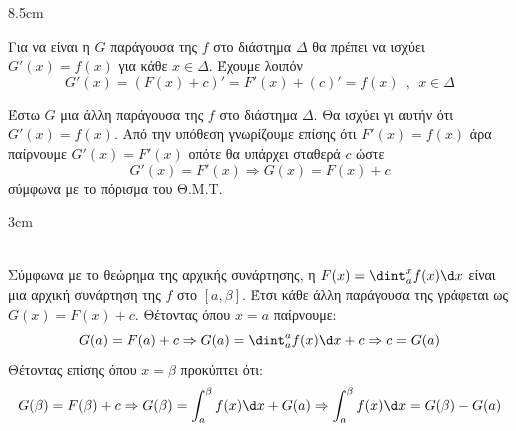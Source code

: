 \begin{Thewrhmabox}{8.5cm}
\label{thewrhma:arxikh_synarthsh}
\end{Thewrhmabox}
\textbf{}
\begin{alist}
\item Για να είναι η $ G $ παράγουσα της $ f $ στο διάστημα $ \varDelta $ θα πρέπει να ισχύει $ G'(x)=f(x) $ για κάθε $ x\in\varDelta $. Έχουμε λοιπόν
\[ G'(x)=(F(x)+c)'=F'(x)+(c)'=f(x)\ \ ,\ \ x\in\varDelta \]
\item Έστω $ G $ μια άλλη παράγουσα της $ f $ στο διάστημα $ \varDelta $. Θα ισχύει γι αυτήν ότι $ G'(x)=f(x) $. Από την υπόθεση γνωρίζουμε επίσης ότι $ F'(x)=f(x) $ άρα παίρνουμε $ G'(x)=F'(x) $ οπότε θα υπάρχει σταθερά $ c $ ώστε
\[ G'(x)=F'(x)\Rightarrow G(x)=F(x)+c \]
σύμφωνα με το πόρισμα του Θ.Μ.Τ.
\end{alist}
\begin{Thewrhmabox}{3cm}
\label{thewrhma:themelivdes_oloklhrwtikou}
\end{Thewrhmabox}
\textbf{}\\
Σύμφωνα με το θεώρημα της αρχικής συνάρτησης, η $ F(x)=\dint_{a}^{x}{f(x)\d x} $ είναι μια αρχική συνάρτηση της $ f $  στο $ [a,\beta] $. Έτσι κάθε άλλη παράγουσα της γράφεται ως $ G(x)=F(x)+c $. Θέτοντας όπου $ x=a $ παίρνουμε:
\[ G(a)=F(a)+c\Rightarrow G(a)=\dint_{a}^{a}{f(x)\d x}+c\Rightarrow c=G(a) \]
Θέτοντας επίσης όπου $ x=\beta $ προκύπτει ότι:
\[ G(\beta)=F(\beta)+c\Rightarrow G(\beta)=\int_{a}^{\beta}{f(x)\d x}+G(a)\Rightarrow \int_{a}^{\beta}{f(x)\d x}=G(\beta)-G(a) \]
